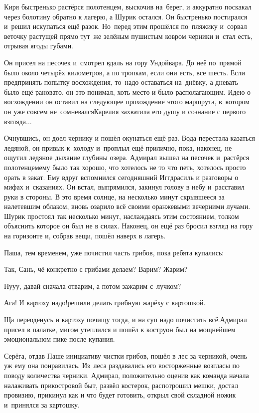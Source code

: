 Киря быстренько растёрся полотенцем, выскочив на~берег, и аккуратно поскакал через болотину обратно к лагерю, а Шурик остался. Он быстренько постирался и~решил искупаться ещё разок. Но~перед этим прошёлся по~пляжику и~сорвал веточку растущей прямо тут~же зелёным пушистым ковром черники и~стал есть, отрывая ягоды губами. 

Он присел на песочек и~смотрел вдаль на гору Ундойвара. До неё по~прямой было около четырёх километров, а по тропкам, если они есть, все шесть. Если предпринять попытку восхождения, то~надо оставаться на~днёвку, а дневать было ещё рановато, он это понимал, хоть место и было располагающим. Идею о восхождении он оставил на следующее прохождение этого маршрута, в~котором он уже совсем не~сомневался\mdash Карелия захватила его душу и сознание с первого взгляда$\ldots$ 

Очнувшись, он доел чернику и пошёл окунаться ещё раз. Вода перестала казаться ледяной, он привык к~холоду и~проплыл ещё прилично, пока, наконец, не ощутил ледяное дыхание глубины озера. Адмирал вышел на песочек и~растёрся полотенцем\mdash ему было так хорошо, что хотелось не то что петь, хотелось просто орать в закат. Ему вдруг вспомнился сегодняшний Иггдрасиль и разговоры о мифах и~сказаниях. Он встал, выпрямился, закинул голову в небу и~расставил руки в стороны. В это время солнце, на несколько минут скрывшееся за налетевшим облаком, вновь озарило всё своими оранжевыми вечерними лучами. Шурик простоял так несколько минут, наслаждаясь этим состоянием, толком объяснить которое он был не в силах. Наконец, он ещё раз бросил взгляд на гору на горизонте и, собрав вещи, пошёл наверх в лагерь.

Паша, тем временем, уже почистил часть грибов, пока ребята купались:

\diagdash Так, Сань, чё конкретно с грибами делаем? Варим? Жарим?

\diagdash Ну\sdash у\sdash у, давай сначала отварим, а потом зажарим с~лучком?

\diagdash Ага! И картоху надо!\mdash решили делать грибную жарёху с картошкой.

\diagdash Ща переоденусь и картоху почищу тогда, и на суп надо почистить всё.\mdash Адмирал присел в палатке, мигом утеплился и пошёл к костру\mdash он был на мощнейшем эмоциональном пике после купания.

Серёга, отдав Паше инициативу чистки грибов, пошёл в лес за черникой, очень уж ему она понравилась. Из~леса раздавались его восторженные возгласы по поводу количества черники. Адмирал, положительно оценив как команда начала налаживать прикостровой быт, развёл костерок, распотрошил мешки, достал провизию, прикинул как и что будет готовить, открыл свой складной ножик и~принялся за картошку.

